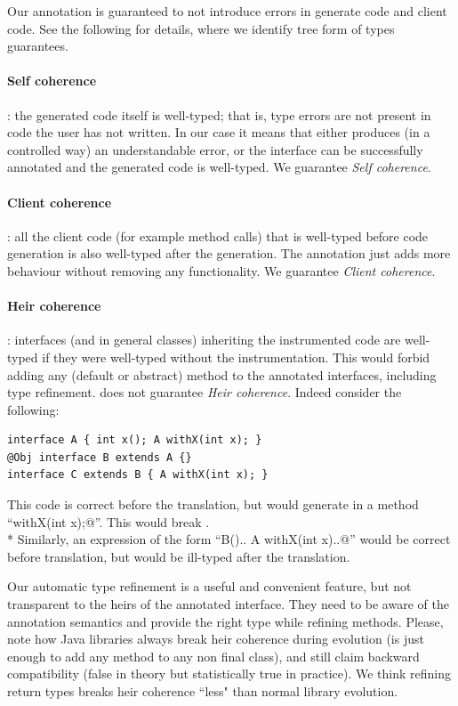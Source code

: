Our annotation is guaranteed to not introduce errors in generate code and client code.
See the following for details, where we identify tree form of types guarantees.


\paragraph{Self coherence}: the generated code itself is well-typed; that is,
  type errors are not present in code the user has not written.
In our case it means that either \mixin{} produces (in a controlled way) an
understandable error, or the interface can be successfully annotated and the generated code is well-typed.
We guarantee \textit{Self coherence}.

\paragraph{Client coherence}: all the client code (for example method calls)
  that is well-typed before code generation is also well-typed after the generation.
The annotation just adds more behaviour without removing any functionality.
We guarantee \textit{Client coherence}.

\paragraph{Heir coherence}: interfaces (and in general classes) inheriting the instrumented code are well-typed if they were well-typed without the instrumentation.
This would forbid adding any (default or abstract) method to the annotated interfaces, including type refinement.
\mixin  does not guarantee \textit{Heir coherence}.
Indeed consider the following:

\begin{lstlisting}
interface A { int x(); A withX(int x); }
@Obj interface B extends A {}
interface C extends B { A withX(int x); }
\end{lstlisting}

\noindent This code is correct before the translation, but \mixin would  generate in \Q@B@  a method ``\Q@B withX(int x);@''.
This would break \Q@C@. \\*
Similarly, an expression of the form ``\Q@new B(){.. A withX(int x){..}}@''
would be correct before translation, but would be ill-typed after the translation.

Our automatic type refinement
is a useful and convenient feature, but not transparent to the heirs of the annotated interface.
They need to be aware of the annotation semantics and provide the right type while refining methods.
Please, note how Java libraries always break heir coherence during evolution
 (is just enough to add any method to any non final class), and still claim backward compatibility
 (false in theory but statistically true in practice).
We think refining return types breaks heir coherence ``less" than normal library evolution.

